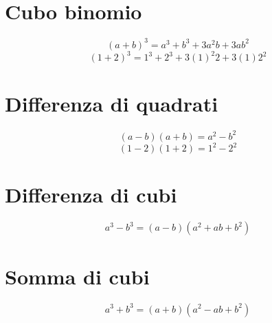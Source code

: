 \section{Cubo binomio}
\begin{equation*}
(a+b)^3=a^3+b^3+3a^2b+3ab^2
\end{equation*}
\begin{equation*}
(1+2)^3=1^3+2^3+3(1)^2 2+3(1)2^2
\end{equation*}
\section{Differenza di quadrati}
\begin{equation*}
(a-b)(a+b)=a^2-b^2
\end{equation*}
\begin{equation*}
(1-2)(1+2)=1^2-2^2
\end{equation*}
\section{Differenza di cubi}
\begin{equation*}
a^3-b^3=(a-b)(a^2+ab+b^2)
\end{equation*}
\section{Somma di cubi}
\begin{equation*}
a^3+b^3=(a+b)(a^2-ab+b^2)
\end{equation*}
